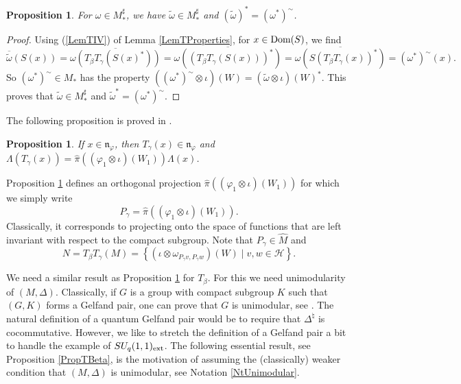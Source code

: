 \documentclass[pdftex]{sigma}
\numberwithin{equation}{section}
\newtheorem{prop}[thm]{Proposition}
\theoremstyle{definition}
\newcommand{\cHil}{\mathcal{H}}
\newcommand{\nphi}{\mathfrak{n}_\varphi}
\newcommand{\Dom}{\text{\rm Dom}}
\begin{document}
\begin{prop}\label{PropSharpTilde}
 For $\omega \in M_\ast^\sharp$, we have $\tilde{\omega} \in M_\ast^\sharp$ and $(\tilde{\omega})^\ast = (\omega^\ast)^{\sim}$.
\end{prop}
\begin{proof}
Using (\ref{LemTIV}) of Lemma \ref{LemTProperties}, for $x \in \Dom(S)$, we f\/ind
\[
 \overline{\tilde{\omega}}(S(x)) = \overline{\omega(T_\beta T_\gamma (S(x)^\ast))} = \overline{\omega((T_\beta T_\gamma (S(x)))^\ast)} = \overline{ \omega(S(T_\beta T_\gamma(x))^\ast)} = (\omega^\ast)^\sim(x).
\]
So $(\omega^\ast)^\sim \in M_\ast$ has the property $((\omega^\ast)^\sim \otimes \iota)(W) = (\tilde{\omega}  \otimes \iota)(W)^\ast$. This proves that $\tilde{\omega} \in M_\ast^\sharp$ and $\tilde{\omega}^\ast = (\omega^\ast)^\sim$.
\end{proof}

The following proposition is proved in \cite[Proposition 3.1]{VaeVaiExt}.

\begin{prop}\label{PropTGamma}
If $x \in \nphi$, then $T_\gamma (x) \in \nphi$ and $\Lambda(T_\gamma(x)) = \hat{\pi}((\varphi_1 \otimes \iota)(W_1)) \Lambda(x)$.
\end{prop}

Proposition \ref{PropTGamma} def\/ines an orthogonal projection $\hat{\pi}((\varphi_1 \otimes \iota)(W_1))$ for which we simply write
\[
P_\gamma = \hat{\pi}((\varphi_1 \otimes \iota)(W_1)).
\]
 Classically, it corresponds to projecting onto the space of functions that are left invariant with respect to the compact subgroup. Note that $P_\gamma \in \hat{M}$ and
\[
N = T_\beta T_\gamma(M) = \left\{ (\iota \otimes \omega_{P_\gamma v, P_\gamma w})(W) \mid v,w \in \cHil \right\}.
\]

We need a similar result as Proposition \ref{PropTGamma} for $T_\beta$. For this we need unimodularity of $(M, \Delta)$. Classically, if $G$ is a group with compact subgroup $K$ such that $(G, K)$ forms a Gelfand pair, one can prove that $G$ is unimodular, see \cite[Proposition~I.1]{Far}. The natural def\/inition of a quantum Gelfand pair would be to require that $\Delta^\natural$ is cocommutative. However, we like to stretch the def\/inition of a Gelfand pair a bit to handle the example of $SU_q(1,1)_{{\rm ext}}$. The following essential result, see Proposition \ref{PropTBeta}, is the motivation of assuming the (classically) weaker condition that $(M, \Delta)$ is unimodular, see Notation \ref{NtUnimodular}.
\end{document}
